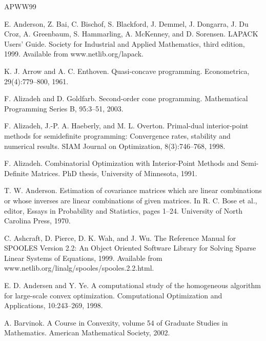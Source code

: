 \begingroup\small\raggedright
\renewcommand{\bibname}{参考文献}
\begin{thebibliography}{APWW99}

 E. Anderson, Z. Bai, C. Bischof, S. Blackford, J. Demmel, J. Dongarra, J. Du Croz, A. Greenbaum, S. Hammarling, A. McKenney, and D. Sorensen. LAPACK Users’ Guide. Society for Industrial and Applied Mathematics, third edition, 1999. Available from www.netlib.org/lapack.

 K. J. Arrow and A. C. Enthoven. Quasi-concave programming. Econometrica, 29(4):779–800, 1961.

 F. Alizadeh and D. Goldfarb. Second-order cone programming. Mathematical Programming Series B, 95:3–51, 2003.

 F. Alizadeh, J.-P. A. Haeberly, and M. L. Overton. Primal-dual interior-point methods for semidefinite programming: Convergence rates, stability and numerical results. SIAM Journal on Optimization, 8(3):746–768, 1998.

 F. Alizadeh. Combinatorial Optimization with Interior-Point Methods and Semi-Definite Matrices. PhD thesis, University of Minnesota, 1991.

 T. W. Anderson. Estimation of covariance matrices which are linear combinations or whose inverses are linear combinations of given matrices. In R. C. Bose et al., editor, Essays in Probability and Statistics, pages 1–24. University of North Carolina Press, 1970.

 C. Ashcraft, D. Pierce, D. K. Wah, and J. Wu. The Reference Manual for SPOOLES Version 2.2: An Object Oriented Software Library for Solving Sparse Linear Systems of Equations, 1999. Available from www.netlib.org/linalg/spooles/spooles.2.2.html.

 E. D. Andersen and Y. Ye. A computational study of the homogeneous algorithm for large-scale convex optimization. Computational Optimization and Applications, 10:243–269, 1998.

 A. Barvinok. A Course in Convexity, volume 54 of Graduate Studies in Mathematics. American Mathematical Society, 2002.


\end{thebibliography}
